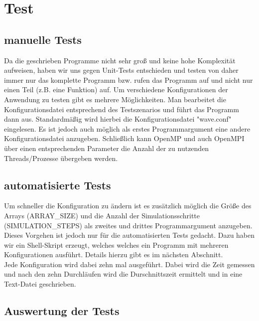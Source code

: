 
\section{Test}

\subsection{manuelle Tests}
Da die geschrieben Programme nicht sehr groß und keine hohe Komplexität aufweisen, haben wir uns gegen Unit-Tests entschieden und testen von daher immer nur das komplette Programm bzw. rufen das Programm auf und nicht nur einen Teil (z.B. eine Funktion) auf.
Um verschiedene Konfigurationen der Anwendung zu testen gibt es mehrere Möglichkeiten. Man bearbeitet die Konfigurationsdatei entsprechend des Testszenarios und führt das Programm dann aus. Standardmäßig wird hierbei die Konfigurationsdatei "wave.conf" eingelesen. Es ist jedoch auch möglich als erstes Programmargument eine andere Konfigurationsdatei anzugeben. Schließlich kann OpenMP und auch OpenMPI über einen entsprechenden Parameter die Anzahl der zu nutzenden Threads/Prozesse übergeben werden.\\

\subsection{automatisierte Tests}
Um schneller die Konfiguration zu ändern ist es zusätzlich möglich die Größe des Arrays (ARRAY\_SIZE) und die Anzahl der Simulationsschritte (SIMULATION\_STEPS) als zweites und drittes Programmargument anzugeben. Dieses Vorgehen ist jedoch nur für die automatisierten Tests gedacht. Dazu haben wir ein Shell-Skript erzeugt, welches welches ein Programm mit mehreren Konfigurationen ausführt. Details hierzu gibt es im nächsten Abschnitt.\\
Jede Konfiguration wird dabei zehn mal ausgeführt. Dabei wird die Zeit gemessen und nach den zehn Durchläufen wird die Durschnittszeit ermittelt und in eine Text-Datei geschrieben.

\subsection{Auswertung der Tests} %

